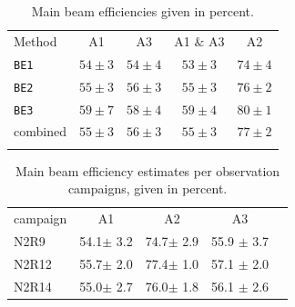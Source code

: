 \begin{table}[!h]
  \caption[]{Main beam efficiencies given in percent.}
  \label{tab:beam_efficiency}
  \centering
  \begin{tabular}{l cccc}
    \hline\hline
    \noalign{\smallskip}
    Method & A1 &  A3 & A1 $\&$ A3 &  A2  \\
    \noalign{\smallskip}
    \hline
    \noalign{\smallskip}
    {\tt BE1}  &  $54 \pm 3$  & $54 \pm 4$  &  $53 \pm 3$  &  $74 \pm 4$  \\
    {\tt BE2} &  $55 \pm 3$  & $56 \pm 3$  &  $55 \pm 3$  &  $76 \pm 2$  \\
    {\tt BE3}&  $59 \pm 7$  & $58 \pm 4$  &  $59 \pm 4$  &  $80 \pm 1$  \\
    combined          &  $55 \pm 3$  & $56 \pm 3$  &  $55 \pm 3$  &  $77 \pm 2$  \\
    \noalign{\smallskip}
    \hline
  \end{tabular}
\end{table}


\begin{table}[!ht]
\caption{Main beam efficiency estimates per observation campaigns,
given in percent.}
\label{tab:MB}
\centering
\begin{tabular}{lcccc}
\hline\hline
\noalign{\smallskip}
campaign &  A1    &    A2   &  A3    \\
\noalign{\smallskip}
\hline
\noalign{\smallskip}
N2R9    &  54.1$\pm$ 3.2   &  74.7$\pm$ 2.9  & 55.9 $\pm$ 3.7      \\
N2R12   &  55.7$\pm$ 2.0   &  77.4$\pm$ 1.0  & 57.1 $\pm$ 2.0      \\
N2R14   &  55.0$\pm$ 2.7   &  76.0$\pm$ 1.8  & 56.1 $\pm$ 2.6     \\
            \hline
\end{tabular}
\end{table}

